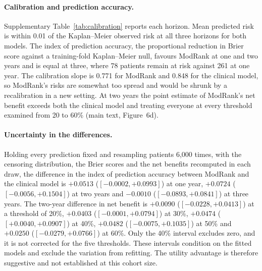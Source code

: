 \documentclass[11pt]{article}
\begin{document}
\paragraph{Calibration and prediction accuracy.} Supplementary Table~\ref{tab:calibration} reports each horizon. Mean
predicted risk is within 0.01 of the Kaplan--Meier observed risk at all three horizons for both
models. The index of prediction accuracy, the proportional reduction in Brier score against a
training-fold Kaplan--Meier null, favours ModRank at one and two years and is equal at three, where
78 patients remain at risk against 261 at one year. The calibration slope is 0.771 for ModRank and
0.848 for the clinical model, so ModRank's risks are somewhat too spread and would be shrunk by a
recalibration in a new setting. At two years the point estimate of ModRank's net benefit exceeds
both the clinical model and treating everyone at every threshold examined from 20 to 60\% (main
text, Figure~6d).

\paragraph{Uncertainty in the differences.} Holding every prediction fixed and resampling patients
6,000 times, with the censoring distribution, the Brier scores and the net benefits recomputed in
each draw, the difference in the index of prediction accuracy between ModRank and the clinical model
is $+0.0513$ ($[-0.0002, +0.0993]$) at one year, $+0.0724$ ($[-0.0056, +0.1504]$) at two years and
$-0.0010$ ($[-0.0893, +0.0841]$) at three years. The two-year difference in net benefit is
$+0.0090$ ($[-0.0228, +0.0413]$) at a threshold of 20\%, $+0.0403$ ($[-0.0001, +0.0794]$) at 30\%,
$+0.0474$ ($[+0.0040, +0.0907]$) at 40\%, $+0.0482$ ($[-0.0075, +0.1035]$) at 50\% and $+0.0250$
($[-0.0279, +0.0766]$) at 60\%. Only the 40\% interval excludes zero, and it is not corrected for the
five thresholds. These intervals condition on the fitted models and exclude the variation from
refitting. The utility advantage is therefore suggestive and not established at this
cohort size.
\end{document}

